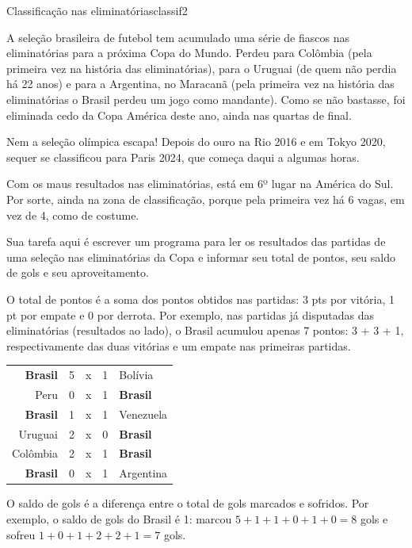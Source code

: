 \documentclass[12pt,a4paper,oneside]{article}
\begin{document}
\begin{problem}{Classificação nas eliminatórias}{classif}{2}
 
A seleção brasileira de futebol tem acumulado uma série de fiascos nas eliminatórias para a próxima Copa do Mundo. Perdeu para Colômbia (pela primeira vez na história das eliminatórias), para o Uruguai (de quem não perdia há 22 anos) e para a Argentina, no Maracanã (pela primeira vez na história das eliminatórias o Brasil perdeu um jogo como mandante). Como se não bastasse, foi eliminada cedo da Copa América deste ano, ainda nas quartas de final. 

Nem a seleção olímpica escapa! Depois do ouro na Rio 2016 e em Tokyo 2020, sequer se classificou para Paris 2024, que começa daqui a algumas horas.

Com os maus resultados nas eliminatórias, está em 6º lugar na América do Sul. Por sorte, ainda na zona de classificação, porque pela primeira vez há 6 vagas, em vez de 4, como de costume.

Sua tarefa aqui é escrever um programa para ler os resultados das partidas de uma seleção nas eliminatórias da Copa e informar seu total de pontos, seu saldo de gols e seu aproveitamento.

\begin{minipage}{.58\textwidth}
O total de pontos é a soma dos pontos obtidos nas partidas: 3 pts por vitória, 1 pt por empate e 0 por derrota. Por exemplo, nas partidas já disputadas das eliminatórias (resultados ao lado), o Brasil acumulou apenas 7 pontos: 3 + 3 + 1, respectivamente das duas vitórias e um empate nas primeiras partidas.
\end{minipage}
\hfill
\begin{minipage}{.35\textwidth}
\begin{tabular}{rcccl}
\textbf{Brasil} & 5 & x & 1 &Bolívia\\
Peru & 0 & x & 1 & \textbf{Brasil}\\
\textbf{Brasil} & 1 & x & 1 & Venezuela\\
Uruguai & 2 & x & 0 & \textbf{Brasil}\\
Colômbia & 2 & x & 1 & \textbf{Brasil}\\
\textbf{Brasil} & 0 & x & 1 & Argentina
\end{tabular}
\end{minipage}

O saldo de gols é a diferença entre o total de gols marcados e sofridos. Por exemplo, o saldo de gols do Brasil é 1: marcou $5+1+1+0+1+0 = 8$ gols e sofreu $1+0+1+2+2+1 = 7$ gols.


\end{problem}
\end{document}
